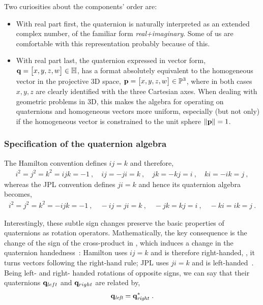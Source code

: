Two curiosities about the components' order are:
%
\begin{itemize}
\item
With real part first, the quaternion is naturally interpreted as an extended complex number, of the familiar form \emph{real+imaginary}. 
Some of us are comfortable with this representation probably because of this.
\item
With real part last, the quaternion expressed in vector form,
%
${\bf q}=\begin{bmatrix}
x,y,z,w
\end{bmatrix}\in{\mathbb H}$, 
%
has a format absolutely equivalent to the homogeneous vector in the projective 3D space, 
%
${\bf p}=\begin{bmatrix}
x,y,z,w
\end{bmatrix}\in{\mathbb P}^3$, 
%
where in both cases $x,y,z$ are clearly identified with the three Cartesian axes. 
When dealing with geometric problems in 3D, this makes the algebra for operating on quaternions and homogeneous vectors more uniform, 
especially (but not only) if the homogeneous vector is constrained to the unit sphere ${\left\|{\bf p}\right\|}=1$.
\end{itemize}

\subsubsection{Specification of the quaternion algebra}


The Hamilton convention defines $ij=k$ and therefore,
%
\begin{align}
i^2 = j^2 = k^2 = ijk = -1~,\quad ij = -ji = k~, \quad jk = -kj = i~, \quad ki = -ik = j~,
\end{align}
%
whereas the JPL convention defines $ji=k$ and hence its quaternion algebra becomes,
%
\begin{align}
i^2 = j^2 = k^2 = -ijk = -1~,\quad -ij = ji = k~, \quad -jk = kj = i~, \quad -ki = ik = j~.
\end{align}

Interestingly, these subtle sign changes preserve the basic properties of quaternions as rotation operators. 
Mathematically, the key consequence is the change of the sign of the cross-product in , which induces a change in the quaternion handedness~\citep{SHUSTER-93}: 
Hamilton uses $ij=k$ and is therefore right-handed, \ie, it turns vectors following the right-hand rule; JPL uses $ji=k$ and is left-handed~\citep{TRAWNY-05-QUAT}. 
Being left- and right- handed rotations of opposite signs, we can say that their quaternions ${\bf q}_{left}$ and ${\bf q}_{right}$ are related by,
%
\begin{align}
{\bf q}_{\textit{left}}= {\bf q}_{\textit{right}}^*~.
\end{align}



